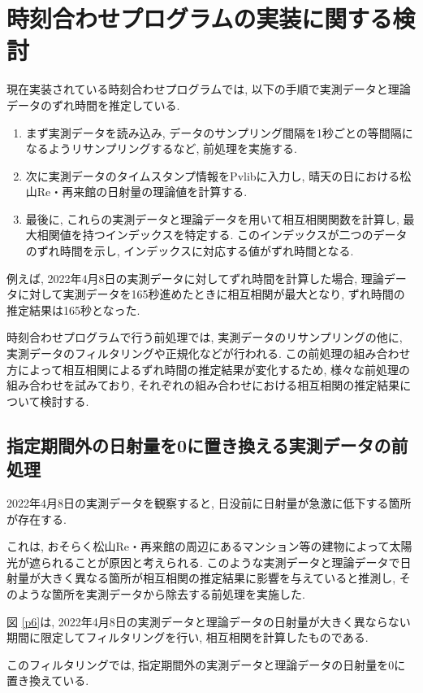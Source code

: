 \documentclass[a4j,12pt,]{jarticle}
\begin{document}
\section{時刻合わせプログラムの実装に関する検討}
現在実装されている時刻合わせプログラムでは, 以下の手順で実測データと理論データのずれ時間を推定している.

\begin{enumerate}
  \item まず実測データを読み込み, データのサンプリング間隔を1秒ごとの等間隔になるようリサンプリングするなど, 前処理を実施する.
  \item 次に実測データのタイムスタンプ情報をPvlibに入力し, 晴天の日における松山Re・再来館の日射量の理論値を計算する.
  \item 最後に, これらの実測データと理論データを用いて相互相関関数を計算し, 最大相関値を持つインデックスを特定する. このインデックスが二つのデータのずれ時間を示し, インデックスに対応する値がずれ時間となる.
\end{enumerate}

例えば, 2022年4月8日の実測データに対してずれ時間を計算した場合, 理論データに対して実測データを165秒進めたときに相互相関が最大となり, ずれ時間の推定結果は165秒となった.

時刻合わせプログラムで行う前処理では, 実測データのリサンプリングの他に, 実測データのフィルタリングや正規化などが行われる. この前処理の組み合わせ方によって相互相関によるずれ時間の推定結果が変化するため, 様々な前処理の組み合わせを試みており, それぞれの組み合わせにおける相互相関の推定結果について検討する.

\subsection{指定期間外の日射量を0に置き換える実測データの前処理}
2022年4月8日の実測データを観察すると, 日没前に日射量が急激に低下する箇所が存在する.

これは, おそらく松山Re・再来館の周辺にあるマンション等の建物によって太陽光が遮られることが原因と考えられる. このような実測データと理論データで日射量が大きく異なる箇所が相互相関の推定結果に影響を与えていると推測し, そのような箇所を実測データから除去する前処理を実施した.

図 \ref{p6}は, 2022年4月8日の実測データと理論データの日射量が大きく異ならない期間に限定してフィルタリングを行い, 相互相関を計算したものである.

このフィルタリングでは, 指定期間外の実測データと理論データの日射量を0に置き換えている.
\end{document}
